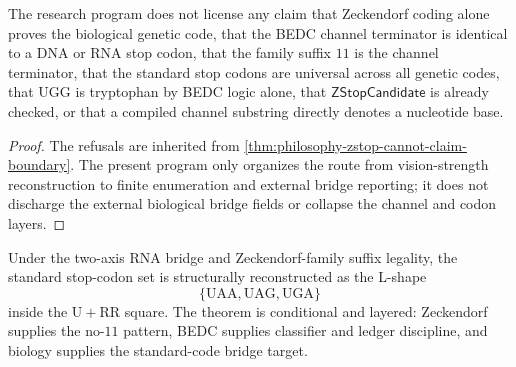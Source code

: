 \begin{theorem}
\label{thm:philosophy-zterm-research-cannot-claim-boundary}
The research program does not license any claim that Zeckendorf coding
alone proves the biological genetic code, that the BEDC channel
terminator is identical to a DNA or RNA stop codon, that the family
suffix $11$ is the channel terminator, that the standard stop codons are
universal across all genetic codes, that $\mathrm{UGG}$ is tryptophan by
BEDC logic alone, that $\mathsf{ZStopCandidate}$ is already checked, or
that a compiled channel substring directly denotes a nucleotide base.
\end{theorem}
\begin{proof}
The refusals are inherited from
\autoref{thm:philosophy-zstop-cannot-claim-boundary}. The present
program only organizes the route from vision-strength reconstruction to
finite enumeration and external bridge reporting; it does not discharge
the external biological bridge fields or collapse the channel and codon
layers.
\end{proof}

\begin{corollary}
\label{cor:philosophy-zterm-research-allowed-claim}
Under the two-axis RNA bridge and Zeckendorf-family suffix legality, the
standard stop-codon set is structurally reconstructed as the L-shape
$$
  \{\mathrm{UAA},\mathrm{UAG},\mathrm{UGA}\}
$$
inside the $\mathrm{U}+\mathrm{RR}$ square. The theorem is conditional
and layered: Zeckendorf supplies the no-$11$ pattern, BEDC supplies
classifier and ledger discipline, and biology supplies the standard-code
bridge target.
\end{corollary}
